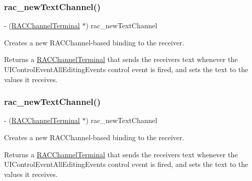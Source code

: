 \subsubsection{\texorpdfstring{rac\+\_\+new\+Text\+Channel()}{rac\_newTextChannel()}\hspace{0.1cm}{\footnotesize\ttfamily [1/3]}}
{\footnotesize\ttfamily -\/ (\mbox{\hyperlink{interface_r_a_c_channel_terminal}{R\+A\+C\+Channel\+Terminal}} $\ast$) rac\+\_\+new\+Text\+Channel \begin{DoxyParamCaption}{ }\end{DoxyParamCaption}}

Creates a new R\+A\+C\+Channel-\/based binding to the receiver.

Returns a \mbox{\hyperlink{interface_r_a_c_channel_terminal}{R\+A\+C\+Channel\+Terminal}} that sends the receiver\textquotesingle{}s text whenever the U\+I\+Control\+Event\+All\+Editing\+Events control event is fired, and sets the text to the values it receives. \mbox{\label{category_u_i_text_field_07_r_a_c_signal_support_08_a531a00a7a1fb4ffec0a479844e5d1ded}} 
\subsubsection{\texorpdfstring{rac\+\_\+new\+Text\+Channel()}{rac\_newTextChannel()}\hspace{0.1cm}{\footnotesize\ttfamily [2/3]}}
{\footnotesize\ttfamily -\/ (\mbox{\hyperlink{interface_r_a_c_channel_terminal}{R\+A\+C\+Channel\+Terminal}} $\ast$) rac\+\_\+new\+Text\+Channel \begin{DoxyParamCaption}{ }\end{DoxyParamCaption}}

Creates a new R\+A\+C\+Channel-\/based binding to the receiver.

Returns a \mbox{\hyperlink{interface_r_a_c_channel_terminal}{R\+A\+C\+Channel\+Terminal}} that sends the receiver\textquotesingle{}s text whenever the U\+I\+Control\+Event\+All\+Editing\+Events control event is fired, and sets the text to the values it receives. \mbox{\label{category_u_i_text_field_07_r_a_c_signal_support_08_a531a00a7a1fb4ffec0a479844e5d1ded}} 
